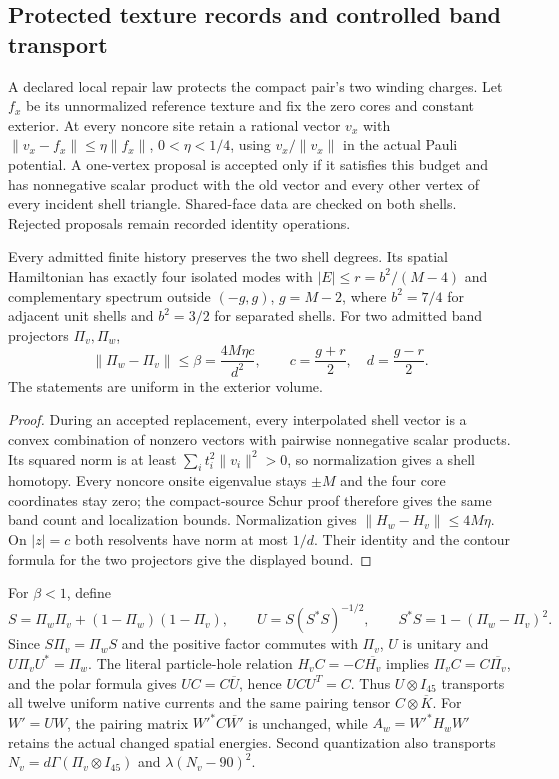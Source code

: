 \subsection{Protected texture records and controlled band transport}
\label{sec:compact-defect-transport}

A declared local repair law protects the compact pair's two winding charges.
Let $f_x$ be its unnormalized reference texture and fix the zero cores and
constant exterior. At every noncore site retain a rational vector $v_x$ with
$\lVert v_x-f_x\rVert\le\eta\lVert f_x\rVert$, $0<\eta<1/4$, using
$v_x/\lVert v_x\rVert$ in the actual Pauli potential. A one-vertex proposal
is accepted only if it satisfies this budget and has nonnegative scalar
product with the old vector and every other vertex of every incident shell
triangle. Shared-face data are checked on both shells. Rejected proposals
remain recorded identity operations.

\begin{proposition}
Every admitted finite history preserves the two shell degrees. Its spatial
Hamiltonian has exactly four isolated modes with $|E|\le r=b^2/(M-4)$ and
complementary spectrum outside $(-g,g)$, $g=M-2$, where $b^2=7/4$ for adjacent
unit shells and $b^2=3/2$ for separated shells. For two admitted band
projectors $\Pi_v,\Pi_w$,
\[
 \lVert\Pi_w-\Pi_v\rVert\le\beta
 =\frac{4M\eta c}{d^2},\qquad c=\frac{g+r}{2},\quad d=\frac{g-r}{2}.
\]
The statements are uniform in the exterior volume.
\end{proposition}
\begin{proof}
During an accepted replacement, every interpolated shell vector is a convex
combination of nonzero vectors with pairwise nonnegative scalar products.
Its squared norm is at least $\sum_i t_i^2\lVert v_i\rVert^2>0$, so
normalization gives a shell homotopy. Every noncore onsite eigenvalue stays
$\pm M$ and the four core coordinates stay zero; the compact-source Schur
proof therefore gives the same band count and localization bounds.
Normalization gives $\lVert H_w-H_v\rVert\le4M\eta$. On $|z|=c$ both
resolvents have norm at most $1/d$. Their identity and the contour formula
for the two projectors give the displayed bound.
\end{proof}

For $\beta<1$, define
\[
 S=\Pi_w\Pi_v+(1-\Pi_w)(1-\Pi_v),\qquad
 U=S(S^*S)^{-1/2},\qquad S^*S=1-(\Pi_w-\Pi_v)^2.
\]
Since $S\Pi_v=\Pi_wS$ and the positive factor commutes with $\Pi_v$,
$U$ is unitary and $U\Pi_vU^*=\Pi_w$. The literal particle-hole relation
$H_vC=-C\overline{H_v}$ implies $\Pi_vC=C\overline{\Pi_v}$, and the polar
formula gives $UC=C\overline U$, hence $UCU^T=C$. Thus $U\otimes I_{45}$
transports all twelve uniform native currents and the same pairing tensor
$C\otimes\overline K$. For $W'=UW$, the pairing matrix
$W'^*C\overline{W'}$ is unchanged, while $A_w=W'^*H_wW'$ retains the actual
changed spatial energies. Second quantization also transports
$N_v=d\Gamma(\Pi_v\otimes I_{45})$ and $\lambda(N_v-90)^2$.

